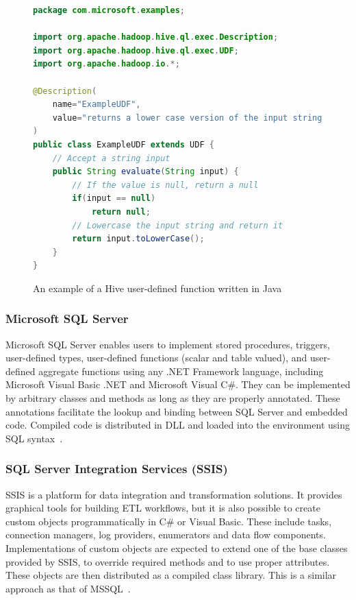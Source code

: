 \begin{figure}[ht]
\begin{lstlisting}[language=Java]
package com.microsoft.examples;

import org.apache.hadoop.hive.ql.exec.Description;
import org.apache.hadoop.hive.ql.exec.UDF;
import org.apache.hadoop.io.*;

@Description(
    name="ExampleUDF",
    value="returns a lower case version of the input string."
)
public class ExampleUDF extends UDF {
    // Accept a string input
    public String evaluate(String input) {
        // If the value is null, return a null
        if(input == null)
            return null;
        // Lowercase the input string and return it
        return input.toLowerCase();
    }
}
\end{lstlisting}
\caption{An example of a Hive user-defined function written in Java~\cite{hiveudfexample}}
\label{fig:hiveScript}
\end{figure}

\subsubsection{Microsoft SQL Server}
Microsoft SQL Server enables users to implement stored procedures, triggers, user-defined types, user-defined functions (scalar and table valued), and user-defined aggregate functions using any .NET Framework language, including Microsoft Visual Basic .NET and Microsoft Visual C\#. They can be implemented by arbitrary classes and methods as long as they are properly annotated. These annotations facilitate the lookup and binding between SQL Server and embedded code. Compiled code is distributed in DLL and loaded into the environment using SQL syntax~\cite{mssql}.

\subsubsection{SQL Server Integration Services (SSIS)}
SSIS is a platform for data integration and transformation solutions. It provides graphical tools for building ETL workflows, but it is also possible to create custom objects programmatically in C\# or Visual Basic. These include tasks, connection managers, log providers, enumerators and data flow components. Implementations of custom objects are expected to extend one of the base classes provided by SSIS, to override required methods and to use proper attributes. These objects are then distributed as a compiled class library. This is a similar approach as that of MSSQL~\cite{ssis}.

